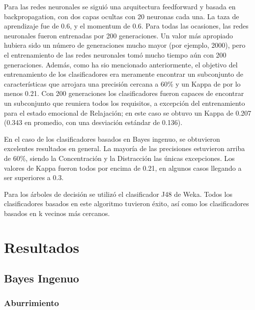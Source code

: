 Para las redes neuronales se siguió una arquitectura feedforward
y basada en backpropagation, con dos capas ocultas con 20 neuronas
cada una. La taza de aprendizaje fue de 0.6, y el momentum de
0.6. Para todas las ocasiones, las redes neuronales fueron entrenadas
por 200 generaciones. Un valor más apropiado hubiera sido un número de
generaciones mucho mayor (por ejemplo, 2000), pero el entrenamiento de
las redes neuronales tomó mucho tiempo aún con 200
generaciones. Además, como ha sio mencionado anteriormente, el
objetivo del entrenamiento de los clasificadores era meramente
encontrar un subconjunto de características que arrojara una precisión
cercana a 60\% y un Kappa de por lo menos 0.21. Con 200 generaciones
los clasificadores fueron capaces de encontrar un subconjunto que
reuniera todos los requisitos, a excepción del entrenamiento para el
estado emocional de Relajación; en este caso se obtuvo un Kappa de
0.207 (0.343 en promedio, con una desviación estándar de 0.136).

En el caso de los clasificadores basados en Bayes ingenuo, se
obtuvieron excelentes resultados en general. La mayoría
de las precisiones estuvieron arriba de 60\%, siendo la Concentración
y la Distracción las únicas excepciones. Los valores de Kappa fueron
todos por encima de 0.21, en algunos casos llegando a ser superiores a
0.3.

Para los árboles de decisión se utilizó el clasificador J48 de
Weka. Todos los clasificadores basados en este algoritmo tuvieron
éxito, así como los clasificadores basados en k vecinos más cercanos.

\clearpage
\FloatBarrier

\section{Resultados}

\subsection{Bayes Ingenuo}

\subsubsection{Aburrimiento}


